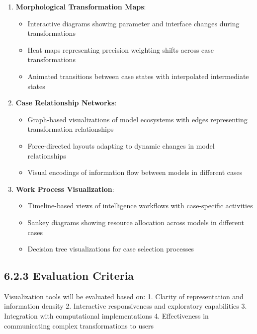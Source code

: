 \documentclass[
  11pt,
  letterpaper,
]{article}
\providecommand{\tightlist}{%
  \setlength{\itemsep}{0pt}\setlength{\parskip}{0pt}}
\begin{document}
\begin{enumerate}
\def\labelenumi{\arabic{enumi}.}
\tightlist
\item
  \textbf{Morphological Transformation Maps}:

  \begin{itemize}
  \tightlist
  \item
    Interactive diagrams showing parameter and interface changes during
    transformations
  \item
    Heat maps representing precision weighting shifts across case
    transformations
  \item
    Animated transitions between case states with interpolated
    intermediate states
  \end{itemize}
\item
  \textbf{Case Relationship Networks}:

  \begin{itemize}
  \tightlist
  \item
    Graph-based visualizations of model ecosystems with edges
    representing transformation relationships
  \item
    Force-directed layouts adapting to dynamic changes in model
    relationships
  \item
    Visual encodings of information flow between models in different
    cases
  \end{itemize}
\item
  \textbf{Work Process Visualization}:

  \begin{itemize}
  \tightlist
  \item
    Timeline-based views of intelligence workflows with case-specific
    activities
  \item
    Sankey diagrams showing resource allocation across models in
    different cases
  \item
    Decision tree visualizations for case selection processes
  \end{itemize}
\end{enumerate}

\hypertarget{evaluation-criteria}{%
\subsection{6.2.3 Evaluation Criteria}\label{evaluation-criteria}}

Visualization tools will be evaluated based on: 1. Clarity of
representation and information density 2. Interactive responsiveness and
exploratory capabilities 3. Integration with computational
implementations 4. Effectiveness in communicating complex
transformations to users
\end{document}
